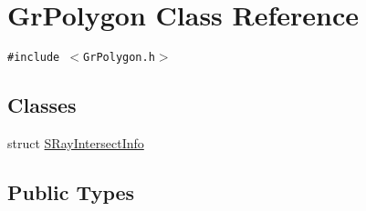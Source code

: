 \hypertarget{class_gr_polygon}{
\section{GrPolygon Class Reference}
\label{class_gr_polygon}
}
{\tt \#include $<$GrPolygon.h$>$}

\subsection*{Classes}
\begin{CompactItemize}
\item 
struct \hyperlink{struct_gr_polygon_1_1_s_ray_intersect_info}{SRayIntersectInfo}
\end{CompactItemize}
\subsection*{Public Types}
